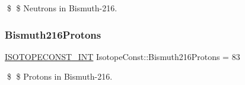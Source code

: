 \$ \$ Neutrons in Bismuth-\/216. \mbox{\label{group___isotope_const-_bismuth-_bi216_gac7f6441b24100bfafe7c7d7e59c37025}} 
\subsubsection{\texorpdfstring{Bismuth216\+Protons}{Bismuth216Protons}}
{\footnotesize\ttfamily \mbox{\hyperlink{group___isotope_const-_macros_ga5f18360b3e99483a35c32d789e62621c}{I\+S\+O\+T\+O\+P\+E\+C\+O\+N\+S\+T\+\_\+\+I\+NT}} Isotope\+Const\+::\+Bismuth216\+Protons = 83}

\$ \$ Protons in Bismuth-\/216. 